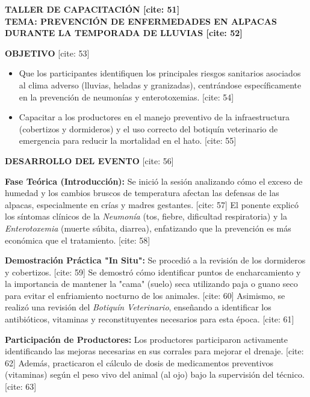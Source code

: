 \documentclass[11pt,a4paper]{article}
\begin{document}
\newpage %

\begin{center}
    \Large\bfseries TALLER DE CAPACITACIÓN [cite: 51] \\
    \large TEMA: PREVENCIÓN DE ENFERMEDADES EN ALPACAS DURANTE LA TEMPORADA DE LLUVIAS [cite: 52]
\end{center}

\vspace{0.4cm}

\textbf{OBJETIVO} [cite: 53]
\begin{itemize}
    \item Que los participantes identifiquen los principales riesgos sanitarios asociados al clima adverso (lluvias, heladas y granizadas), centrándose específicamente en la prevención de neumonías y enterotoxemias. [cite: 54]
    \item Capacitar a los productores en el manejo preventivo de la infraestructura (cobertizos y dormideros) y el uso correcto del botiquín veterinario de emergencia para reducir la mortalidad en el hato. [cite: 55]
\end{itemize}

\textbf{DESARROLLO DEL EVENTO} [cite: 56]

\textbf{Fase Teórica (Introducción):} Se inició la sesión analizando cómo el exceso de humedad y los cambios bruscos de temperatura afectan las defensas de las alpacas, especialmente en crías y madres gestantes. [cite: 57] El ponente explicó los síntomas clínicos de la \textit{Neumonía} (tos, fiebre, dificultad respiratoria) y la \textit{Enterotoxemia} (muerte súbita, diarrea), enfatizando que la prevención es más económica que el tratamiento. [cite: 58]

\textbf{Demostración Práctica "In Situ":} Se procedió a la revisión de los dormideros y cobertizos. [cite: 59] Se demostró cómo identificar puntos de encharcamiento y la importancia de mantener la "cama" (suelo) seca utilizando paja o guano seco para evitar el enfriamiento nocturno de los animales. [cite: 60] Asimismo, se realizó una revisión del \textit{Botiquín Veterinario}, enseñando a identificar los antibióticos, vitaminas y reconstituyentes necesarios para esta época. [cite: 61]

\textbf{Participación de Productores:} Los productores participaron activamente identificando las mejoras necesarias en sus corrales para mejorar el drenaje. [cite: 62] Además, practicaron el cálculo de dosis de medicamentos preventivos (vitaminas) según el peso vivo del animal (al ojo) bajo la supervisión del técnico. [cite: 63]
\end{document}
